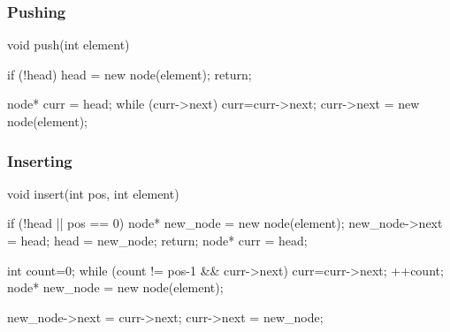 \documentclass{report}
\begin{document}
    \pagebreak 
    \subsubsection{Pushing}
    \bigbreak \noindent 
    \begin{cppcode}
        void push(int element) {
            if (!head) {
                head = new node(element);
                return;
            }

            node* curr = head;
            while (curr->next) {
                curr=curr->next;
            }
            curr->next = new node(element);
        }
    \end{cppcode}

    \pagebreak 
    \subsubsection{Inserting}
    \bigbreak \noindent 
    \begin{cppcode}
        void insert(int pos, int element) {
            if (!head || pos == 0) {
                node* new_node = new node(element);
                new_node->next = head;
                head = new_node;
                return;
            }
            node* curr = head;

            int count=0;
            while (count != pos-1 && curr->next) {
                curr=curr->next;
                ++count;
            }
            node* new_node = new node(element);

            new_node->next = curr->next;
            curr->next = new_node;
        }
    \end{cppcode}
    \bigbreak \noindent 
\end{document}
